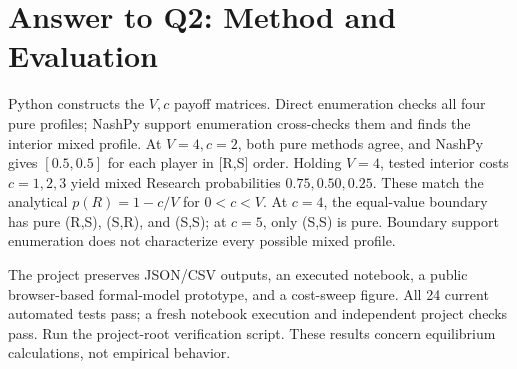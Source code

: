 \section{Answer to Q2: Method and Evaluation}
Python constructs the \(V,c\) payoff matrices. Direct enumeration checks all four pure profiles; NashPy support enumeration cross-checks them and finds the interior mixed profile. At \(V=4,c=2\), both pure methods agree, and NashPy gives \([0.5,0.5]\) for each player in [R,S] order. Holding \(V=4\), tested interior costs \(c=1,2,3\) yield mixed Research probabilities \(0.75,0.50,0.25\). These match the analytical \(p(R)=1-c/V\) for \(0<c<V\). At \(c=4\), the equal-value boundary has pure (R,S), (S,R), and (S,S); at \(c=5\), only (S,S) is pure. Boundary support enumeration does not characterize every possible mixed profile.

The project preserves JSON/CSV outputs, an executed notebook, a public browser-based formal-model prototype, and a cost-sweep figure. All 24 current automated tests pass; a fresh notebook execution and independent project checks pass. Run the project-root verification script. These results concern equilibrium calculations, not empirical behavior.
